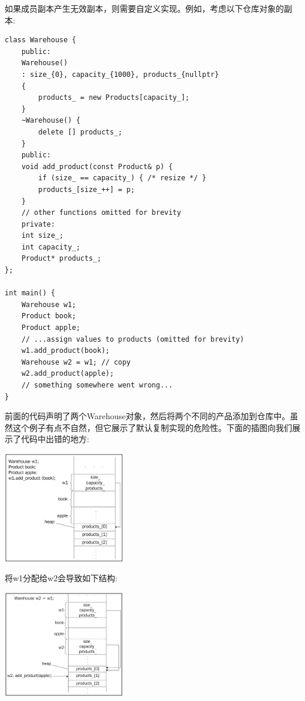 如果成员副本产生无效副本，则需要自定义实现。例如，考虑以下仓库对象的副本: \par

\begin{lstlisting}[caption={}]
class Warehouse {
	public:
	Warehouse()
	: size_{0}, capacity_{1000}, products_{nullptr}
	{
		products_ = new Products[capacity_];
	}
	~Warehouse() {
		delete [] products_;
	}
	public:
	void add_product(const Product& p) {
		if (size_ == capacity_) { /* resize */ }
		products_[size_++] = p;
	}
	// other functions omitted for brevity
	private:
	int size_;
	int capacity_;
	Product* products_;
};

int main() {
	Warehouse w1;
	Product book;
	Product apple;
	// ...assign values to products (omitted for brevity)
	w1.add_product(book);
	Warehouse w2 = w1; // copy
	w2.add_product(apple);
	// something somewhere went wrong...
}
\end{lstlisting}

前面的代码声明了两个Warehouse对象，然后将两个不同的产品添加到仓库中。虽然这个例子有点不自然，但它展示了默认复制实现的危险性。下面的插图向我们展示了代码中出错的地方: \par

\begin{center}
	\includegraphics[width=0.4\textwidth]{content/Section-1/Chapter-3/8}
\end{center}

将w1分配给w2会导致如下结构: \par

\begin{center}
	\includegraphics[width=0.4\textwidth]{content/Section-1/Chapter-3/9}
\end{center}

